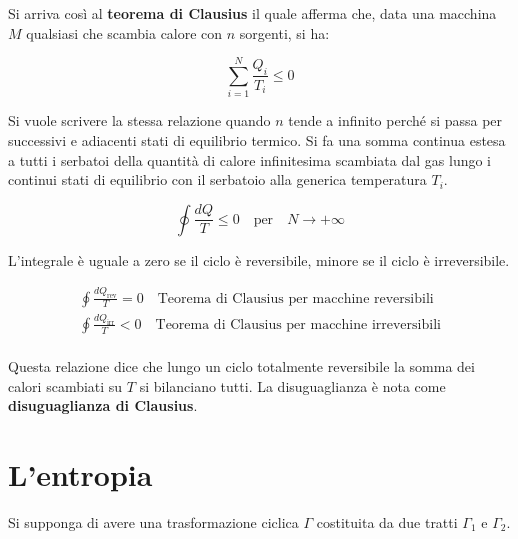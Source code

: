 \begin{figure}[htpb]
\end{figure}
\FloatBarrier
Si arriva così al \textbf{teorema di Clausius} il quale afferma che, data una macchina $M$ qualsiasi che scambia calore con $n$ sorgenti, si ha:

\[
	\sum_{i=1}^N \frac{Q_i }{T_i } \le 0
\]

Si vuole scrivere la stessa relazione quando $n$ tende a infinito perché si passa per successivi e adiacenti stati di equilibrio termico. Si fa una somma continua estesa a tutti i serbatoi della quantità di calore infinitesima scambiata dal gas lungo i continui stati di equilibrio con il serbatoio alla generica temperatura $T_i$.

\[
	\oint \frac{dQ}{T} \le 0 \quad \text{per} \quad N\to +\infty
\]

L'integrale è uguale a zero se il ciclo è reversibile, minore se il ciclo è irreversibile.

\begin{gather*}
	\oint \frac{dQ_{\text{rev} } }{T} = 0 \quad \text{Teorema di Clausius per macchine reversibili} \\
	\oint \frac{dQ_{\text{irr} } }{T} < 0 \quad \text{Teorema di Clausius per macchine irreversibili} \\
\end{gather*}

Questa relazione dice che lungo un ciclo totalmente reversibile la somma dei calori scambiati su $T$ si bilanciano tutti. La disuguaglianza è nota come \textbf{disuguaglianza di Clausius}.

\section{L'entropia}

Si supponga di avere una trasformazione ciclica $\Gamma$ costituita da due tratti $\Gamma_1$ e $\Gamma_2$.

